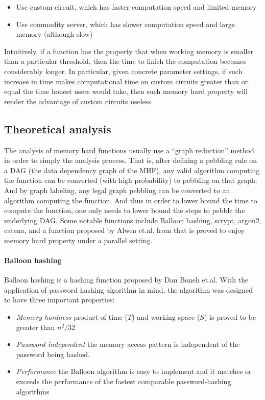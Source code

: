 \begin{itemize}
  \item Use custom circuit, which has faster computation speed and limited memory
  \item Use commodity server, which has slower computation speed and large memory (although slow)
\end{itemize}

Intuitively, if a function has the property that when working memory is smaller than a particular threshold, then the time to finish the computation
becomes considerably longer. In particular, given concrete parameter settings, if such increase in time makes computational time on custom circuits
greater than or equal the time honest users would take, then such memory hard property will render the advantage of custom circuits useless.

\subsection{Theoretical analysis}
The analysis of memory hard functions usually use a ``graph reduction'' method in order to simply the analysis process. That is, after defining a pebbling
rule on a DAG (the data dependency graph of the MHF), any valid algorithm computing the function can be converted (with high probability) to pebbling on
that graph. And by graph labeling\cite{dziembowski2011one}, any legal graph pebbling can be converted to an algorithm computing the function. And thus
in order to lower bound the time to compute the function, one only needs to lower bound the steps to pebble the underlying DAG. Some notable functions include
Balloon hashing, scrypt, argon2, catena, and a function proposed by Alwen et.al. from \cite{alwen2015high} that is proved to enjoy memory hard property
under a parallel setting.

\paragraph{Balloon hashing}
Balloon hashing\cite{corrigan2016balloon} is a hashing function proposed by Dan Boneh et.al.
With the application of password hashing algorithm in mind, the algorithm was designed to
have three important properties:

\begin{itemize}
  \item \textit{Memory hardness} product of time ($T$) and working space ($S$) is proved to be greater than $n^2/32$
  \item \textit{Password independent} the memory access pattern is independent of the password being hashed.
  \item \textit{Performance} the Balloon algorithm is easy to implement and it matches or exceeds the performance of the fastest comparable password-hashing algorithms
\end{itemize}

